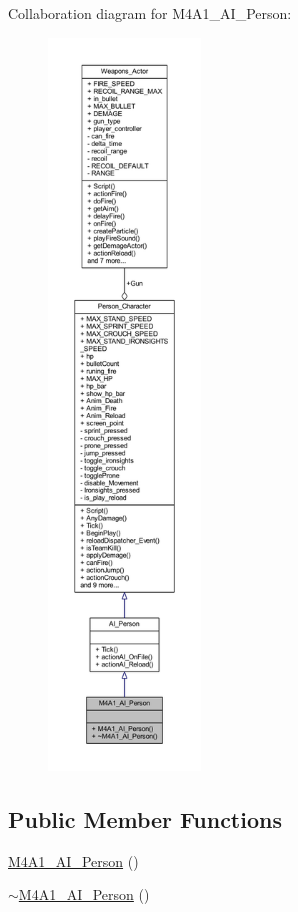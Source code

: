 Collaboration diagram for M4\+A1\+\_\+\+A\+I\+\_\+\+Person\+:\nopagebreak
\begin{figure}[H]
\begin{center}
\leavevmode
\includegraphics[height=550pt]{class_m4_a1___a_i___person__coll__graph}
\end{center}
\end{figure}
\subsection*{Public Member Functions}
\begin{DoxyCompactItemize}
\item 
\hyperlink{class_m4_a1___a_i___person_a1a1d34a7ba795d72ec60e73383e566f6}{M4\+A1\+\_\+\+A\+I\+\_\+\+Person} ()
\item 
\hyperlink{class_m4_a1___a_i___person_ab2861a6fd7067eba8bc7656b08987cba}{$\sim$\+M4\+A1\+\_\+\+A\+I\+\_\+\+Person} ()
\end{DoxyCompactItemize}
